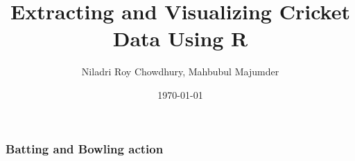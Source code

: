 \documentclass{beamer}
\begin{document}
\title[Extracting and Visualizing Cricket Data]{Extracting and Visualizing Cricket Data Using R}
\author[Niladri \& Mahbub]{Niladri Roy Chowdhury, Mahbubul Majumder}
\date[\today]{\today}


\begin{frame}
	\maketitle
\end{frame}

\begin{frame}
  \frametitle{Batting and Bowling action}
  
	\begin{columns}
	
		\begin{column}{0.5\textwidth}
			 \begin{center}  \end{center}
		\end{column}
		

\end{columns}
\end{frame}
\end{document}
